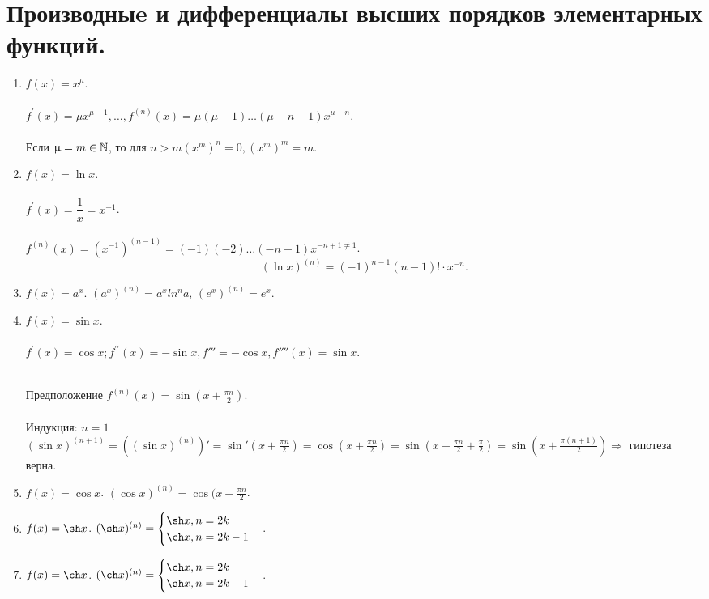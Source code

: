 \section{Производныe и дифференциалы высших порядков элементарных функций.}
\begin{enumerate}
	\item $f(x)=x^{\mu}$.\\\\
	$f^\prime(x)=\mu x^{\mu - 1}, \dots , f^{(n)}(x)=\mu(\mu - 1)\dots(\mu - n + 1)x^{\mu - n}$.\\\\
	Если $\upmu = m \in \mathbb{N}$, то для $n > m (x^m)^n = 0, (x^m)^m = m$.
	\item $f(x) = \ln x$.\\\\
	$f^\prime(x) = \dfrac{1}{x} = x^{-1}$.\\\\
	$f^{(n)}(x) = (x^{-1})^{(n - 1)} = (-1)(-2)\dots(-n+1)x^{-n + 1 \not = 1}$.
	$$(\ln x)^{(n)} = (-1)^{n - 1}(n - 1)!\cdot x^{-n}.$$
	\item $f(x) = a^x$. $(a^x)^{(n)} = a^xln^na$, $(e^x)^{(n)} = e^x$.
	\item $f(x) = \sin x$.\\\\
	$f^\prime(x) = \cos x; f^{\prime\prime}(x) = -\sin x, f'''= -\cos x, f''''(x) = \sin x$.\\\\
	\begin{Proof}
		Предположение $f^{(n)}(x) = \sin(x + \frac{\pi n}{2})$.\\\\
		Индукция: $n = 1$ $(\sin x)^{(n + 1)} = ((\sin x)^{(n)})' = \sin'(x + \frac{\pi n}{2}) = \cos(x + \frac{\pi n}{2}) = \sin(x + \frac{\pi n}{2} + \frac{\pi}{2}) = \sin(x + \frac{\pi (n + 1)}{2}) \Rightarrow$ гипотеза верна. 
		\end{Proof}
	\item $f(x) = \cos x$. $(\cos x)^{(n)} = \cos(x + \frac{\pi n}{2}$.
	\item $f(x) = \sh x$. $(\sh x)^{(n)} = \begin{cases} \sh x, n = 2k\\ \ch x, n = 2k - 1\end{cases}$.
	\item $f(x) = \ch x$. $(\ch x)^{(n)} = \begin{cases} \ch x, n = 2k\\ \sh x, n = 2k - 1 \end{cases}$.
\end{enumerate}
